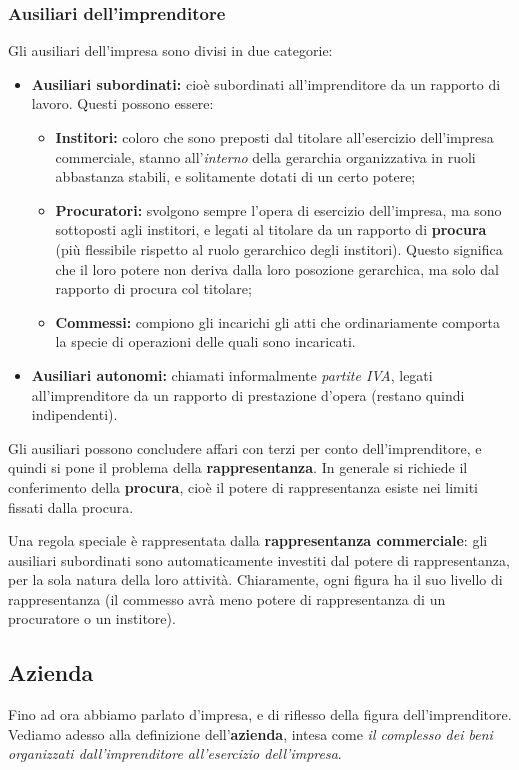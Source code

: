 \documentclass[a4paper,11pt]{article}
\begin{document}
\subsubsection{Ausiliari dell'imprenditore}
Gli ausiliari dell'impresa sono divisi in due categorie:
\begin{itemize}
	\item \textbf{Ausiliari subordinati:} cioè subordinati all'imprenditore da un rapporto di lavoro. Questi possono essere:
		\begin{itemize}
			\item \textbf{Institori:} coloro che sono preposti dal titolare all'esercizio dell'impresa commerciale, stanno all'\textit{interno} della gerarchia organizzativa in ruoli abbastanza stabili, e solitamente dotati di un certo potere;
			\item \textbf{Procuratori:} svolgono sempre l'opera di esercizio dell'impresa, ma sono sottoposti agli institori, e legati al titolare da un rapporto di \textbf{procura} (più flessibile rispetto al ruolo gerarchico degli institori). Questo significa che il loro potere non deriva dalla loro posozione gerarchica, ma solo dal rapporto di procura col titolare;
			\item \textbf{Commessi:} compiono gli incarichi gli atti che ordinariamente comporta la specie di operazioni delle quali sono incaricati.
		\end{itemize}
	\item \textbf{Ausiliari autonomi:} chiamati informalmente \textit{partite IVA}, legati all'imprenditore da un rapporto di prestazione d'opera (restano quindi indipendenti).
\end{itemize}

Gli ausiliari possono concludere affari con terzi per conto dell'imprenditore, e quindi si pone il problema della \textbf{rappresentanza}.
In generale si richiede il conferimento della \textbf{procura}, cioè il potere di rappresentanza esiste nei limiti fissati dalla procura.

Una regola speciale è rappresentata dalla \textbf{rappresentanza commerciale}: gli ausiliari subordinati sono automaticamente investiti dal potere di rappresentanza, per la sola natura della loro attività. Chiaramente, ogni figura ha il suo livello di rappresentanza (il commesso avrà meno potere di rappresentanza di un procuratore o un institore).

\subsection{Azienda}
Fino ad ora abbiamo parlato d'impresa, e di riflesso della figura dell'imprenditore.
Vediamo adesso alla definizione dell'\textbf{azienda}, intesa come \textit{il complesso dei beni organizzati dall'imprenditore all'esercizio dell'impresa}.
\end{document}
